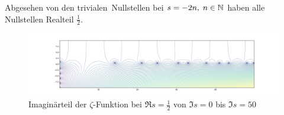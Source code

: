 \begin{frame}
    \begin{theorem}
        Abgesehen von den \glqq trivialen\grqq\ Nullstellen bei $s = -2n,\; n\in \mathbb{N}$ haben alle Nullstellen Realteil $\frac{1}{2}$.
    \end{theorem}
    \begin{figure}
        \includegraphics[trim=181 46 145 44, clip,width=\textwidth]{figures/jupyter_zeros.pdf}
        \caption{Imaginärteil der $\zeta$-Funktion bei $\Re s = \frac{1}{2}$ von $\Im s = 0$ bis $\Im s = 50$}
    \end{figure}
\end{frame}